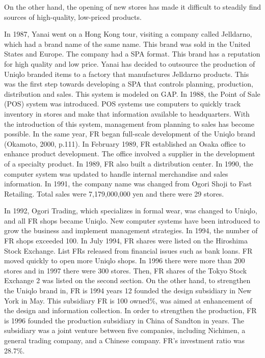 \documentclass[12pt,a4paper]{article}
\begin{document}
On the other hand, the opening of new stores has made it difficult to
steadily find sources of high-quality, low-priced products.

In 1987, Yanai went on a Hong Kong tour, visiting a company called
Jelldarno, which had a brand name of the same name. This brand was sold
in the United States and Europe. The company had a SPA format. This
brand has a reputation for high quality and low price. Yanai has decided
to outsource the production of Uniqlo branded items to a factory that
manufactures Jelldarno products. This was the first step towards
developing a SPA that controls planning, production, distribution and
sales. This system is modeled on GAP. In 1988, the Point of Sale (POS)
system was introduced. POS systems use computers to quickly track
inventory in stores and make that information available to headquarters.
With the introduction of this system, management from planning to sales
has become possible. In the same year, FR began full-scale development
of the Uniqlo brand (Okamoto, 2000, p.111). In February 1989, FR
established an Osaka office to enhance product development. The office
involved a supplier in the development of a specialty product. In 1989,
FR also built a distribution center. In 1990, the computer system was
updated to handle internal merchandise and sales information. In 1991,
the company name was changed from Ogori Shoji to Fast Retailing. Total
sales were 7,179,000,000 yen and there were 29 stores.

In 1992, Ogori Trading, which specializes in formal wear, was changed to
Uniqlo, and all FR shops became Uniqlo. New computer systems have been
introduced to grow the business and implement management strategies. In
1994, the number of FR shops exceeded 100. In July 1994, FR shares were
listed on the Hiroshima Stock Exchange. List FRs released from financial
issues such as bank loans. FR moved quickly to open more Uniqlo shops.
In 1996 there were more than 200 stores and in 1997 there were 300
stores. Then, FR shares of the Tokyo Stock Exchange 2 was listed on the
second section. On the other hand, to strengthen the Uniqlo brand in, FR
is 1994 years 12 founded the design subsidiary in New York in May. This
subsidiary FR is 100 owned\%, was aimed at enhancement of the design and
information collection. In order to strengthen the production, FR is
1996 founded the production subsidiary in China of Sandton in years. The
subsidiary was a joint venture between five companies, including
Nichimen, a general trading company, and a Chinese company. FR's
investment ratio was 28.7\%.
\end{document}
